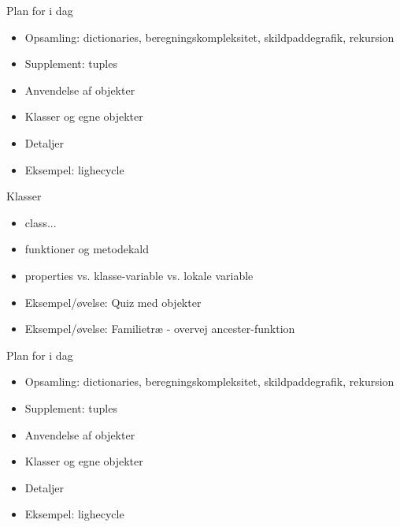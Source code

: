 \documentclass[a4paper,landscape]{slides}
\begin{document}
\begin{slide}
	\begin{center} {\large 
            Plan for i dag
	} \end{center}
	\begin{itemize} \addtolength{\itemsep}{-\baselineskip}
		\item Opsamling: dictionaries, beregningskompleksitet, skildpaddegrafik, rekursion
		\item Supplement: tuples
                \item Anvendelse af objekter
		\item Klasser og egne objekter
		\item Detaljer
                \item Eksempel: lighecycle
	\end{itemize}
\end{slide}

\begin{slide}
	\begin{center} {\large 
            Klasser
	} \end{center}
	\begin{itemize} \addtolength{\itemsep}{-\baselineskip}
		\item class...
		\item funktioner og metodekald
                \item properties vs. klasse-variable vs. lokale variable 
		\item Eksempel/øvelse: Quiz med objekter
		\item Eksempel/øvelse: Familietræ - overvej ancester-funktion
	\end{itemize}
\end{slide}

\begin{slide}
	\begin{center} {\large 
            Plan for i dag
	} \end{center}
	\begin{itemize} \addtolength{\itemsep}{-\baselineskip}
		\item Opsamling: dictionaries, beregningskompleksitet, skildpaddegrafik, rekursion
		\item Supplement: tuples
                \item Anvendelse af objekter
		\item Klasser og egne objekter
		\item Detaljer
                \item Eksempel: lighecycle
	\end{itemize}
\end{slide}
\end{document}
